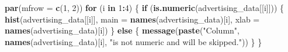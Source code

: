 \documentclass[
]{article}
\newenvironment{Shaded}{\begin{snugshade}}{\end{snugshade}}
\newcommand{\AttributeTok}[1]{\textcolor[rgb]{0.13,0.29,0.53}{#1}}
\newcommand{\ControlFlowTok}[1]{\textcolor[rgb]{0.13,0.29,0.53}{\textbf{#1}}}
\newcommand{\DecValTok}[1]{\textcolor[rgb]{0.00,0.00,0.81}{#1}}
\newcommand{\FunctionTok}[1]{\textcolor[rgb]{0.13,0.29,0.53}{\textbf{#1}}}
\newcommand{\NormalTok}[1]{#1}
\newcommand{\SpecialCharTok}[1]{\textcolor[rgb]{0.81,0.36,0.00}{\textbf{#1}}}
\newcommand{\StringTok}[1]{\textcolor[rgb]{0.31,0.60,0.02}{#1}}
\begin{document}
\begin{Shaded}
\begin{Highlighting}[]
\FunctionTok{par}\NormalTok{(}\AttributeTok{mfrow =} \FunctionTok{c}\NormalTok{(}\DecValTok{1}\NormalTok{, }\DecValTok{2}\NormalTok{))}
\ControlFlowTok{for}\NormalTok{ (i }\ControlFlowTok{in} \DecValTok{1}\SpecialCharTok{:}\DecValTok{4}\NormalTok{) \{}
  \ControlFlowTok{if}\NormalTok{ (}\FunctionTok{is.numeric}\NormalTok{(advertising\_data[[i]])) \{}
    \FunctionTok{hist}\NormalTok{(advertising\_data[[i]],}
         \AttributeTok{main =} \FunctionTok{names}\NormalTok{(advertising\_data)[i],}
         \AttributeTok{xlab =} \FunctionTok{names}\NormalTok{(advertising\_data)[i])}
\NormalTok{  \} }\ControlFlowTok{else}\NormalTok{ \{}
    \FunctionTok{message}\NormalTok{(}\FunctionTok{paste}\NormalTok{(}\StringTok{"Column"}\NormalTok{, }\FunctionTok{names}\NormalTok{(advertising\_data)[i], }\StringTok{"is not numeric and will be skipped."}\NormalTok{))}
\NormalTok{  \}}
\NormalTok{\}}
\end{Highlighting}
\end{Shaded}
\end{document}
